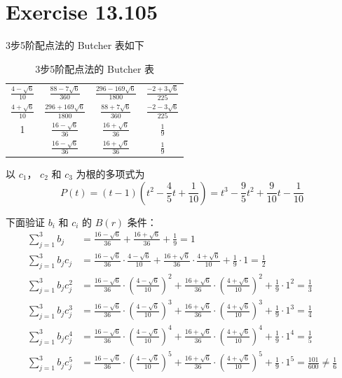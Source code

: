 \documentclass[a4paper]{article}
\begin{document}
\section*{Exercise 13.105}

\par 3步5阶配点法的 Butcher 表如下
\begin{table}[htbp]
    \centering
    \caption{3步5阶配点法的 Butcher 表}
    \begin{tabular}{c|ccc}
        $\frac{4-\sqrt{6}}{10}$ & $\frac{88-7\sqrt{6}}{360}$ & $\frac{296-169\sqrt{6}}{1800}$ & $\frac{-2+3\sqrt{6}}{225}$ \\
        $\frac{4+\sqrt{6}}{10}$ & $\frac{296+169\sqrt{6}}{1800}$ & $\frac{88+7\sqrt{6}}{360}$ & $\frac{-2-3\sqrt{6}}{225}$\\
        1 & $\frac{16-\sqrt{6}}{36}$ & $\frac{16+\sqrt{6}}{36}$ & $\frac{1}{9}$ \\
        \hline
         & $\frac{16-\sqrt{6}}{36}$ & $\frac{16+\sqrt{6}}{36}$ & $\frac{1}{9}$
    \end{tabular}
\end{table}
\par 以 $c_1$， $c_2$ 和 $c_3$ 为根的多项式为
\begin{equation}
    P(t) = (t-1)\left(
        t^2-\frac{4}{5}t+\frac{1}{10}
    \right)
    = t^3 - \frac{9}{5}t^2 + \frac{9}{10}t - \frac{1}{10}
\end{equation}
\par 下面验证 $b_i$ 和 $c_i$ 的 $B(r)$ 条件：
\begin{equation}
    \begin{aligned}
        \sum_{j=1}^3 b_j &= 
        \frac{16-\sqrt{6}}{36} + \frac{16+\sqrt{6}}{36} + \frac{1}{9} = 1\\
        \sum_{j=1}^3 b_j c_j &= 
        \frac{16-\sqrt{6}}{36}\cdot \frac{4-\sqrt{6}}{10} 
        + \frac{16+\sqrt{6}}{36}\cdot \frac{4+\sqrt{6}}{10} 
        + \frac{1}{9}\cdot 1 = \frac{1}{2} \\
        \sum_{j=1}^3 b_j c_j^2 &=
        \frac{16-\sqrt{6}}{36}\cdot \left(\frac{4-\sqrt{6}}{10} \right)^2
        + \frac{16+\sqrt{6}}{36}\cdot \left(\frac{4+\sqrt{6}}{10} \right)^2
        + \frac{1}{9}\cdot 1^2  = \frac{1}{3} \\
        \sum_{j=1}^3 b_j c_j^3 &= 
        \frac{16-\sqrt{6}}{36}\cdot \left(\frac{4-\sqrt{6}}{10} \right)^3
        + \frac{16+\sqrt{6}}{36}\cdot \left(\frac{4+\sqrt{6}}{10} \right)^3
        + \frac{1}{9}\cdot 1^3  = \frac{1}{4}\\
        \sum_{j=1}^3 b_j c_j^4 &= 
        \frac{16-\sqrt{6}}{36}\cdot \left(\frac{4-\sqrt{6}}{10} \right)^4
        + \frac{16+\sqrt{6}}{36}\cdot \left(\frac{4+\sqrt{6}}{10} \right)^4
        + \frac{1}{9}\cdot 1^4 = \frac{1}{5}\\
        \sum_{j=1}^3 b_j c_j^5 &= 
        \frac{16-\sqrt{6}}{36}\cdot \left(\frac{4-\sqrt{6}}{10} \right)^5
        + \frac{16+\sqrt{6}}{36}\cdot \left(\frac{4+\sqrt{6}}{10} \right)^5
        + \frac{1}{9}\cdot 1^5 = \frac{101}{600} \neq \frac{1}{6}
    \end{aligned}
\end{equation}
\end{document}
